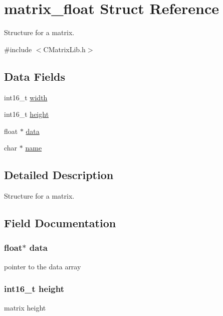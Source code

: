 \hypertarget{structmatrix__float}{}\section{matrix\+\_\+float Struct Reference}
\label{structmatrix__float}


Structure for a matrix.  




{\ttfamily \#include $<$C\+Matrix\+Lib.\+h$>$}

\subsection*{Data Fields}
\begin{DoxyCompactItemize}
\item 
int16\+\_\+t \hyperlink{structmatrix__float_ae0ffb42440f0305b6d22a1c6106b6e6f}{width}
\item 
int16\+\_\+t \hyperlink{structmatrix__float_a777dd66f9609a587ee98ad50de301662}{height}
\item 
float $\ast$ \hyperlink{structmatrix__float_a57ba9c584cf7756552b7d4370e93395f}{data}
\item 
char $\ast$ \hyperlink{structmatrix__float_a5ac083a645d964373f022d03df4849c8}{name}
\end{DoxyCompactItemize}


\subsection{Detailed Description}
Structure for a matrix. 

\subsection{Field Documentation}
\hypertarget{structmatrix__float_a57ba9c584cf7756552b7d4370e93395f}{}
\subsubsection[{data}]{\setlength{\rightskip}{0pt plus 5cm}float$\ast$ data}\label{structmatrix__float_a57ba9c584cf7756552b7d4370e93395f}
pointer to the data array \hypertarget{structmatrix__float_a777dd66f9609a587ee98ad50de301662}{}
\subsubsection[{height}]{\setlength{\rightskip}{0pt plus 5cm}int16\+\_\+t height}\label{structmatrix__float_a777dd66f9609a587ee98ad50de301662}
matrix height \hypertarget{structmatrix__float_a5ac083a645d964373f022d03df4849c8}{}
